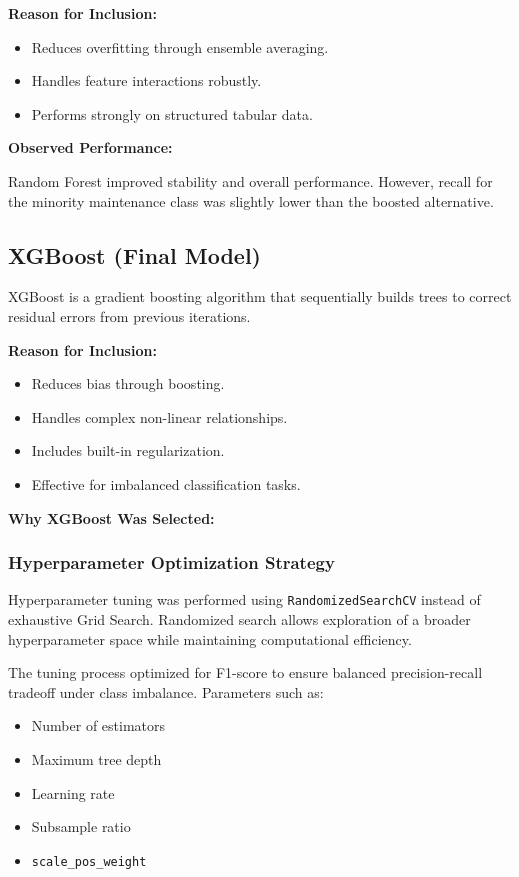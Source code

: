 \documentclass[12pt, a4paper]{article}
\begin{document}
\textbf{Reason for Inclusion:}
\begin{itemize}
\item Reduces overfitting through ensemble averaging.
\item Handles feature interactions robustly.
\item Performs strongly on structured tabular data.
\end{itemize}

\textbf{Observed Performance:}

Random Forest improved stability and overall performance. However, recall for the minority maintenance class was slightly lower than the boosted alternative.

\subsection{XGBoost (Final Model)}

XGBoost is a gradient boosting algorithm that sequentially builds trees to correct residual errors from previous iterations.

\textbf{Reason for Inclusion:}
\begin{itemize}
\item Reduces bias through boosting.
\item Handles complex non-linear relationships.
\item Includes built-in regularization.
\item Effective for imbalanced classification tasks.
\end{itemize}

\textbf{Why XGBoost Was Selected:}
\subsubsection{Hyperparameter Optimization Strategy}

Hyperparameter tuning was performed using \texttt{RandomizedSearchCV} instead of exhaustive Grid Search. Randomized search allows exploration of a broader hyperparameter space while maintaining computational efficiency. 

The tuning process optimized for F1-score to ensure balanced precision-recall tradeoff under class imbalance. Parameters such as:

\begin{itemize}
    \item Number of estimators
    \item Maximum tree depth
    \item Learning rate
    \item Subsample ratio
    \item \texttt{scale\_pos\_weight}
\end{itemize}
\end{document}
